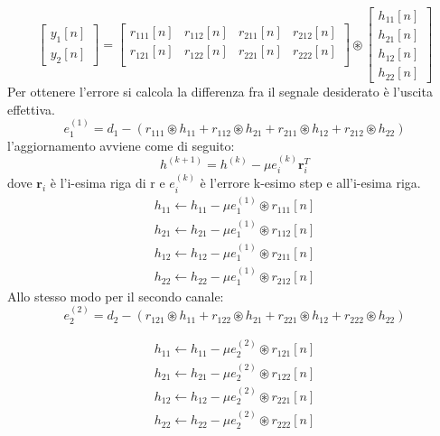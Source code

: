 \documentclass[12pt,a4paper,titlepage]{article}
\begin{document}
\begin{equation}
\begin{bmatrix}
	y_1[n]     \\
	y_2[n]    
\end{bmatrix}
= 
\begin{bmatrix}
	r_{111}[n]  &	r_{112}[n]  &  r_{211}[n]  &	r_{212}[n]    \\
	r_{121}[n]  &	r_{122}[n]  &  r_{221}[n]  &	r_{222}[n]    \\
\end{bmatrix} 
\circledast
\begin{bmatrix}
	h_{11}[n] \\
	h_{21}[n] \\
	h_{12}[n] \\
	h_{22}[n]  
\end{bmatrix} 
\end{equation}
Per ottenere l'errore si calcola la differenza fra il segnale desiderato è l'uscita effettiva.
\[
e_1^{(1)} = d_1 - (r_{111} \circledast h_{11} + r_{112} \circledast h_{21} + r_{211} \circledast h_{12} + r_{212} \circledast h_{22})
\]
l'aggiornamento avviene come di seguito:
\[
h^{(k+1)} = h^{(k)} - \mu e_i^{(k)} \mathbf{r}_i^T
\]
dove $\mathbf{r}_i$ è l'i-esima riga di r e $e_i^{(k)}$ è l'errore k-esimo step e all'i-esima riga.
\[
\begin{split}
h_{11} \leftarrow h_{11} - \mu e_1^{(1)} \circledast r_{111}[n]\\
h_{21} \leftarrow h_{21} - \mu e_1^{(1)} \circledast r_{112}[n]\\
h_{12} \leftarrow h_{12} - \mu e_1^{(1)} \circledast r_{211}[n]\\
h_{22} \leftarrow h_{22} - \mu e_1^{(1)} \circledast r_{212}[n]
\end{split}
\]
Allo stesso modo per il secondo canale:
\[e_2^{(2)} = d_2- (r_{121} \circledast h_{11} + r_{122} \circledast h_{21} + r_{221} \circledast h_{12} + r_{222} \circledast h_{22})
\]

\[
\begin{split}
h_{11} \leftarrow h_{11} - \mu e_2^{(2)} \circledast r_{121}[n]\\
h_{21} \leftarrow h_{21} - \mu e_2^{(2)} \circledast r_{122}[n]\\
h_{12} \leftarrow h_{12} - \mu e_2^{(2)} \circledast r_{221}[n]\\
h_{22} \leftarrow h_{22} - \mu e_2^{(2)} \circledast r_{222}[n]\\
\end{split}
\]
\end{document}
